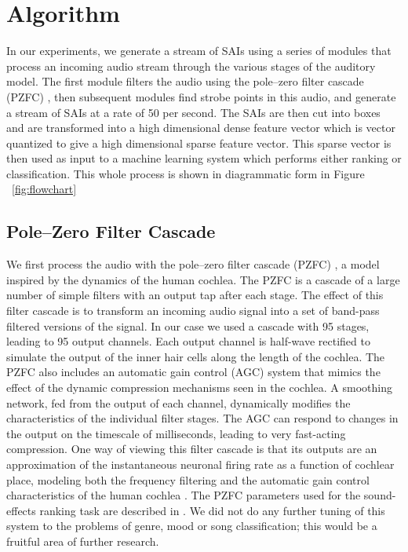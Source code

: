 \section{Algorithm}

In our experiments, we generate a stream of SAIs using a series of modules
that process an incoming audio stream through the various stages of the 
auditory model. The first module filters the audio using the
pole--zero filter cascade (PZFC) \cite{lyon10}, then subsequent modules find 
strobe points in this audio, and generate a stream of SAIs at a rate of 50 per 
second. The SAIs are then cut into boxes and are transformed into a high 
dimensional dense feature vector \cite{rehn2009} which is vector quantized to 
give a high dimensional sparse feature vector. This sparse vector is then used 
as input to a machine learning system which performs either ranking or 
classification. This whole process is shown in diagrammatic form in Figure 
~\ref{fig:flowchart}


\subsection{Pole--Zero Filter Cascade}
We first process the audio with the pole--zero filter cascade (PZFC)
\cite{lyon10}, a model inspired by the dynamics of the human
cochlea. The PZFC is a cascade of a large number of simple filters with an 
output tap after each stage. The effect of this filter cascade is to transform 
an incoming audio signal into a set of band-pass filtered versions of the 
signal. In our case we used a cascade with 95 stages, leading to 95 output 
channels. Each output channel is half-wave rectified to simulate the output of 
the inner hair cells along the length of the cochlea. The PZFC also includes 
an automatic gain control (AGC) system that mimics the effect of the dynamic 
compression mechanisms seen in the cochlea. A smoothing network, fed from the 
output of each channel, dynamically modifies the characteristics of the 
individual filter stages. The AGC can respond to changes in the 
output on the timescale of milliseconds, leading to very fast-acting 
compression. One way of viewing this 
filter cascade is that its outputs are an approximation of the instantaneous 
neuronal firing rate as a function of cochlear place,  modeling both the 
frequency filtering and the automatic gain control characteristics of the 
human cochlea \cite{lyon1990}. The PZFC parameters used for 
the sound-effects ranking task are described in \cite{lyon10}. We did not do 
any further tuning of this system to the problems of genre, mood or song 
classification; this would be a fruitful area of further research.


